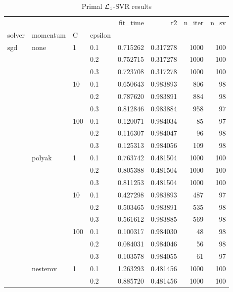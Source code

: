 \begin{table}[H]
\centering
\caption{Primal $\protect \mathcal{L}_1$-SVR results}
\label{primal_l1_svr_cv_results}
\begin{tabular}{llllrrrr}
\toprule
          &   &     &     &  fit\_time &        r2 &  n\_iter &  n\_sv \\
solver & momentum & C & epsilon &           &           &         &       \\
\midrule
sgd & none & 1   & 0.1 &  0.715262 &  0.317278 &    1000 &   100 \\
          &   &     & 0.2 &  0.752715 &  0.317278 &    1000 &   100 \\
          &   &     & 0.3 &  0.723708 &  0.317278 &    1000 &   100 \\
          &   & 10  & 0.1 &  0.650643 &  0.983893 &     806 &    98 \\
          &   &     & 0.2 &  0.787620 &  0.983891 &     884 &    98 \\
          &   &     & 0.3 &  0.812846 &  0.983884 &     958 &    97 \\
          &   & 100 & 0.1 &  0.120071 &  0.984034 &      85 &    97 \\
          &   &     & 0.2 &  0.116307 &  0.984047 &      96 &    98 \\
          &   &     & 0.3 &  0.125313 &  0.984056 &     109 &    98 \\
          & polyak & 1   & 0.1 &  0.763742 &  0.481504 &    1000 &   100 \\
          &   &     & 0.2 &  0.805388 &  0.481504 &    1000 &   100 \\
          &   &     & 0.3 &  0.811253 &  0.481504 &    1000 &   100 \\
          &   & 10  & 0.1 &  0.427298 &  0.983893 &     487 &    97 \\
          &   &     & 0.2 &  0.503465 &  0.983891 &     535 &    98 \\
          &   &     & 0.3 &  0.561612 &  0.983885 &     569 &    98 \\
          &   & 100 & 0.1 &  0.100317 &  0.984030 &      48 &    98 \\
          &   &     & 0.2 &  0.084031 &  0.984046 &      56 &    98 \\
          &   &     & 0.3 &  0.103578 &  0.984055 &      61 &    97 \\
          & nesterov & 1   & 0.1 &  1.263293 &  0.481456 &    1000 &   100 \\
          &   &     & 0.2 &  0.885720 &  0.481456 &    1000 &   100 \\

\end{tabular}
\end{table}
